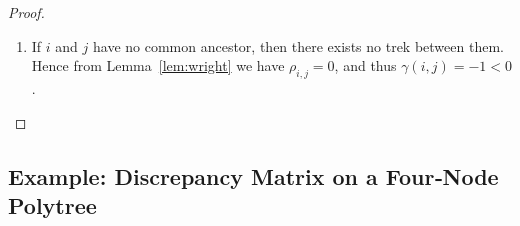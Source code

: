\documentclass[11pt,a4paper]{article}
\numberwithin{equation}{section}
\begin{document}
\begin{proof}
\begin{enumerate}[label=(\arabic*)]
  Taking the ratio gives
  \[
    \frac{\gamma(i,j)}{\gamma(i,k)}
    =
    \frac{\bigl(\lambda^{P(c,i)}\bigr)^{2}\,\Sigma_{c,c}}{\bigl(\lambda^{P(d,i)}\bigr)^{2}\,\Sigma_{d,d}}.
  \]
      Because $c$ is an ancestor of $d$, the path from $c$ to $i$ factors through $d$.
  Hence $\lambda^{P(c,i)}=\lambda^{P(c,d)}\,\lambda^{P(d,i)}$ and
  $\bigl(\lambda^{P(c,i)}\bigr)^{2}
   =\bigl(\lambda^{P(c,d)}\bigr)^{2}\bigl(\lambda^{P(d,i)}\bigr)^{2}$.
  Substituting yields
  \[
    \frac{\gamma(i,j)}{\gamma(i,k)}
    =
    \frac{\bigl(\lambda^{P(c,d)}\bigr)^{2}\,\Sigma_{c,c}}{\Sigma_{d,d}}.
  \]
  It remains to show $\bigl(\lambda^{P(c,d)}\bigr)^{2}\Sigma_{c,c} < \Sigma_{d,d}$.
  Since the underlying undirected graph of the polytree is a tree, every non-root
  node has exactly one parent.  Corollary~\ref{cor:simple_trek_2} with $k=2$
  therefore gives the exact single-parent recursion
  \[
    \Sigma_{n,n} = \lambda_{\mathrm{pa}(n),n}^{2}\,\Sigma_{\mathrm{pa}(n),\mathrm{pa}(n)}
                  + \omega_{n}^{2}
    \qquad\text{for every non-root node }n.
  \]
  Let $c=n_{0}\to n_{1}\to\cdots\to n_{m}=d$ be the unique directed path from
  $c$ to $d$.  Applying the recursion $m$ times along this path gives
  \[
    \Sigma_{d,d}
    \;=\;
    \bigl(\lambda^{P(c,d)}\bigr)^{2}\Sigma_{c,c}
    \;+\;
    \sum_{\ell=1}^{m}
      \bigl(\lambda^{P(n_{\ell},d)}\bigr)^{2}\,\omega_{n_{\ell}}^{2},
  \]
  where $\lambda^{P(n_{\ell},d)}$ is the path monomial from $n_{\ell}$ to $d=n_{m}$.
  The term $\ell=m$ contributes $\bigl(\lambda^{P(d,d)}\bigr)^{2}\omega_{d}^{2}
  =\omega_{d}^{2}>0$, so the entire sum is strictly positive.  Consequently,
  $\Sigma_{d,d}>\bigl(\lambda^{P(c,d)}\bigr)^{2}\Sigma_{c,c}$, and therefore
  \[
    \frac{\gamma(i,j)}{\gamma(i,k)}
    =
    \frac{\bigl(\lambda^{P(c,d)}\bigr)^{2}\,\Sigma_{c,c}}{\Sigma_{d,d}}
    < 1,
  \]
  proving that $\gamma(i,j)<\gamma(i,k)$ whenever $\mathrm{LCA}(i,j)$ is
  strictly below $\mathrm{LCA}(i,k)$ on the path from $\mathrm{LCA}(i,k)$ to $i$.

  \item 
  If $i$ and $j$ have no common ancestor, then there exists no trek between them. Hence from Lemma~\ref{lem:wright} we have $\rho_{i,j} = 0$, and thus $\gamma(i,j) = -1 < 0$.
\end{enumerate}
\end{proof}

\subsection{Example: Discrepancy Matrix on a Four‐Node Polytree}
\end{document}
